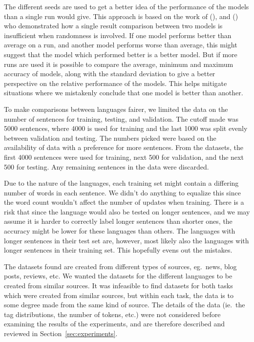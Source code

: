 The different seeds are used to get a better idea of the performance of the
models than a single run would give. This approach is based on the work
of (\cite{reimers2017reporting}), and (\cite{yang2018design}) who demonstrated how a
single result comparison between two models is insufficient when randomness is
involved. If one model performs better than average on a run, and another model
performs worse than average, this might suggest that the model which performed
better is a better model. But if more runs are used it is possible to compare
the average, minimum and maximum accuracy of models, along with the standard
deviation to give a better perspective on the relative performance of the
models. This helps mitigate situations where we mistakenly conclude that one
model is better than another.

To make comparisons between languages fairer, we limited the data on the
number of sentences for training, testing, and validation. The cutoff made was
5000 sentences, where 4000 is used for training and the last 1000 was split
evenly between validation and testing. The numbers picked were based on the
availability of data with a preference for more sentences. From the datasets,
the first 4000 sentences were used for training, next 500 for validation, and
the next 500 for testing. Any remaining sentences in the data were discarded.

Due to the nature of the languages, each training set might contain a differing
number of words in each sentence. We didn't do anything to equalize this since
the word count wouldn't affect the number of updates when training. There is a
risk that since the language would also be tested on longer sentences, and we
may assume it is harder to correctly label longer sentences than shorter ones,
the accuracy might be lower for these languages than others. The languages with
longer sentences in their test set are, however, most likely also the languages
with longer sentences in their training set. This hopefully evens out the
mistakes.

The datasets found are created from different types of sources, eg.\ news, blog
posts, reviews, etc. We wanted the datasets for the different languages to be
created from similar sources. It was infeasible to find datasets for both tasks
which were created from similar sources, but within each task, the data is to
some degree made from the same kind of source. The details of the data (ie.\ the
tag distributions, the number of tokens, etc.) were not considered before
examining the results of the experiments, and are therefore described and
reviewed in Section~\ref{sec:experiments}.

